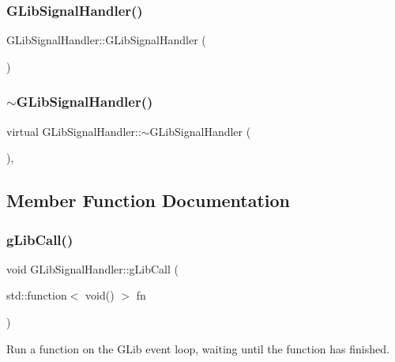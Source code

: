 \subsubsection{\texorpdfstring{G\+Lib\+Signal\+Handler()}{GLibSignalHandler()}}
{\footnotesize\ttfamily G\+Lib\+Signal\+Handler\+::\+G\+Lib\+Signal\+Handler (\begin{DoxyParamCaption}{ }\end{DoxyParamCaption})}

\mbox{\label{classGLibSignalHandler_a026fd58f52f4b6a3cc51bf0a329d89fe}} 
\subsubsection{\texorpdfstring{$\sim$\+G\+Lib\+Signal\+Handler()}{~GLibSignalHandler()}}
{\footnotesize\ttfamily virtual G\+Lib\+Signal\+Handler\+::$\sim$\+G\+Lib\+Signal\+Handler (\begin{DoxyParamCaption}{ }\end{DoxyParamCaption})\hspace{0.3cm}{\ttfamily [inline]}, {\ttfamily [virtual]}}



\subsection{Member Function Documentation}
\mbox{\label{classGLibSignalHandler_a3784efcec39f3f007c06f0f88cda794d}} 
\subsubsection{\texorpdfstring{g\+Lib\+Call()}{gLibCall()}}
{\footnotesize\ttfamily void G\+Lib\+Signal\+Handler\+::g\+Lib\+Call (\begin{DoxyParamCaption}\item[{std\+::function$<$ void() $>$}]{fn }\end{DoxyParamCaption})}

Run a function on the G\+Lib event loop, waiting until the function has finished.


